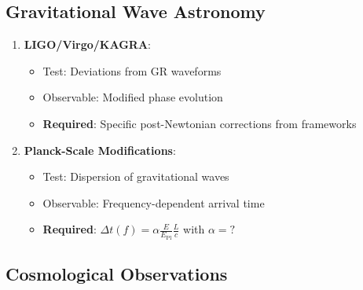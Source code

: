 \subsection{Gravitational Wave Astronomy}

\begin{enumerate}
    \item \textbf{LIGO/Virgo/KAGRA}:
    \begin{itemize}
        \item Test: Deviations from GR waveforms
        \item Observable: Modified phase evolution
        \item \textbf{Required}: Specific post-Newtonian corrections from frameworks
    \end{itemize}

    \item \textbf{Planck-Scale Modifications}:
    \begin{itemize}
        \item Test: Dispersion of gravitational waves
        \item Observable: Frequency-dependent arrival time
        \item \textbf{Required}: $\Delta t(f) = \alpha \frac{E}{E_{\text{Pl}}} \frac{L}{c}$ with $\alpha = ?$
    \end{itemize}
\end{enumerate}

\subsection{Cosmological Observations}

